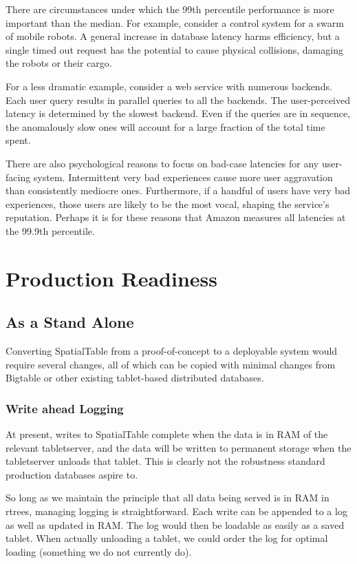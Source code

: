 \documentclass[11pt]{article}
\begin{document}
There are circumstances under which the 99th percentile performance is more important than the median.  For example, consider a control system for a swarm of mobile robots. A general increase in database latency harms efficiency, but a single timed out request has the potential to cause physical collisions, damaging the robots or their cargo.  

For a less dramatic example, consider a web service with numerous backends.  Each user query results in parallel queries to all the backends.  The user-perceived latency is determined by the slowest backend.  Even if the queries are in sequence, the anomalously slow ones will account for a large fraction of the total time spent.

There are also psychological reasons to focus on bad-case latencies for any user-facing system.  Intermittent very bad experiences cause more user aggravation than consistently mediocre ones.\cite{needed}  Furthermore, if a handful of users have very bad experiences, those users are likely to be the most vocal, shaping the service's reputation.  Perhaps it is for these reasons that Amazon measures all latencies at the 99.9th percentile\cite{amazon}.

\section{Production Readiness}

\subsection{As a Stand Alone}

Converting SpatialTable from a proof-of-concept to a deployable system would require several changes, all of which can be copied with minimal changes from Bigtable or other existing tablet-based distributed databases.

\subsubsection{Write ahead Logging}

At present, writes to SpatialTable complete when the data is in RAM of the relevant tabletserver, and the data will be written to permanent storage when the tabletserver unloads that tablet.  This is clearly not the robustness standard production databases aspire to.

So long as we maintain the principle that all data being served is in RAM in rtrees, managing logging is straightforward.  Each write can be appended to a log as well as updated in RAM.  The log would then be loadable as easily as a saved tablet.  When actually unloading a tablet, we could order the log for optimal loading (something we do not currently do).
\end{document}
